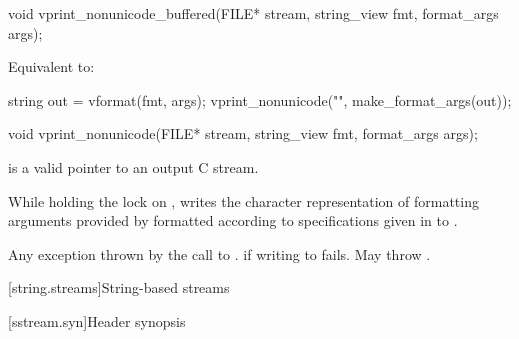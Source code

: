 %
\begin{itemdecl}
void vprint_nonunicode_buffered(FILE* stream, string_view fmt, format_args args);
\end{itemdecl}

\begin{itemdescr}
\pnum
\effects
Equivalent to:
\begin{codeblock}
string out = vformat(fmt, args);
vprint_nonunicode("{}", make_format_args(out));
\end{codeblock}
\end{itemdescr}

%
\begin{itemdecl}
void vprint_nonunicode(FILE* stream, string_view fmt, format_args args);
\end{itemdecl}

\begin{itemdescr}
\pnum
\expects
{} is a valid pointer to an output C stream.

\pnum
\effects
While holding the lock on ,
writes the character representation of
formatting arguments provided by 
formatted according to specifications given in  to .

\pnum
\throws
Any exception thrown by the call to .
 if writing to  fails.
May throw .
\end{itemdescr}

[string.streams]{String-based streams}

[sstream.syn]{Header  synopsis}

